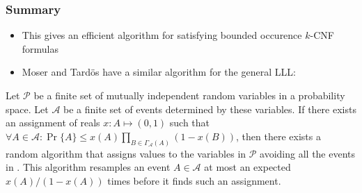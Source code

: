 \documentclass{beamer}
\begin{document}
\frame
{
  \frametitle{Summary}

  \begin{itemize}
    \item This gives an efficient algorithm for satisfying bounded
      occurence $k$-CNF formulas
    \item Moser and Tard\"os have a similar algorithm for the general LLL:
  \end{itemize}
  \begin{thm}
    Let $\mathcal{P}$ be a finite set of mutually independent random
    variables in a probability space. Let $\mathcal{A}$ be a finite set of
    events determined by these variables. If there exists an assignment
    of reals $x : A \mapsto (0, 1)$ such that $\forall A \in \mathcal{A}
    : \Pr\{A\} \le x(A) \prod_{B\in \Gamma_{\mathcal{A}}(A)}
     (1 - x(B))$,
    then there exists a random algorithm that assigns values to the
    variables in $\mathcal{P}$ avoiding all the events in .
    This algorithm resamples an event $A \in \mathcal{A}$ at most
    an expected $x(A)/(1 - x(A))$ times before it finds such an
    assignment. 
   \end{thm}
}
\end{document}
